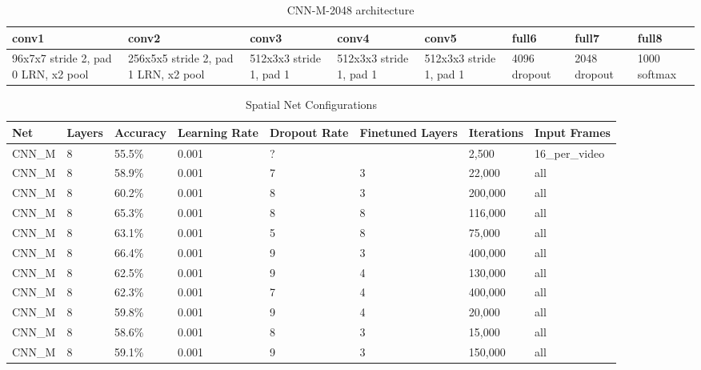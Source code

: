 \begin{table}[H]
\centering
\caption{CNN-M-2048 architecture}
\label{table:cnn-m-208}
\begin{tabularx}{\textwidth}{XXXXXXXX}
\toprule
conv1 & conv2 & conv3 & conv4 & conv5 & full6  & full7 & full8 \\ \midrule
96x7x7  stride 2, pad 0  LRN, x2 pool  &
256x5x5 stride 2, pad 1  LRN, x2 pool  &
512x3x3 stride 1, pad 1   &
512x3x3 stride 1, pad 1   &
512x3x3 stride 1, pad 1   &
4096  dropout  &
2048  dropout  &
1000  softmax  \\
\bottomrule
\end{tabularx}
\end{table}

\begin{table}[H]
\centering
\caption{Spatial Net Configurations}
\label{table:spatial_results}
\begin{tabularx}{\textwidth}{XXXXXXXX}
\toprule
Net 		& Layers	& Accuracy	& Learning Rate 	& Dropout Rate	& Finetuned Layers	& Iterations	& Input Frames\\ \midrule

CNN\_M & 8 & 55.5\%     &  0.001 &  ? &   & 2,500     & 16\_per\_video \\
CNN\_M & 8 & 58.9\%     &  0.001 &  7 & 3 & 22,000    & all \\
CNN\_M & 8 & 60.2\%     &  0.001 &  8 & 3 & 200,000   & all \\
CNN\_M & 8 & 65.3\%     &  0.001 &  8 & 8 & 116,000   & all \\
CNN\_M & 8 & 63.1\%     &  0.001 &  5 & 8 & 75,000    & all \\
CNN\_M & 8 & 66.4\%     &  0.001 &  9 & 3 & 400,000   & all \\
CNN\_M & 8 & 62.5\%     &  0.001 &  9 & 4 & 130,000   & all \\
CNN\_M & 8 & 62.3\%     &  0.001 &  7 & 4 & 400,000   & all \\
CNN\_M & 8 & 59.8\%     &  0.001 &  9 & 4 & 20,000    & all \\
CNN\_M & 8 & 58.6\%     &  0.001 &  8 & 3 & 15,000    & all \\
CNN\_M & 8 & 59.1\%     &  0.001 &  9 & 3 & 150,000   & all \\

\bottomrule
\end{tabularx}
\end{table}



